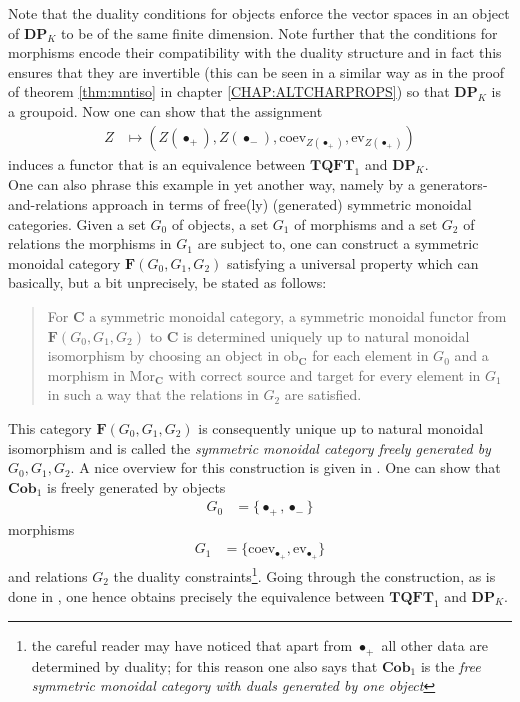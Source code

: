 Note that the duality conditions for objects enforce the vector spaces in an object of $\mathbf{DP}_{K}$ to be of the same finite dimension. Note further that the conditions for morphisms encode their compatibility with the duality structure and in fact this ensures that they are invertible (this can be seen in a similar way as in the proof of theorem \ref{thm:mntiso} in chapter \ref{CHAP:ALTCHARPROPS}) so that $\mathbf{DP}_{K}$ is a groupoid. Now one can show that the assignment
\begin{align*}
  Z
  &\mapsto
  \left(
    Z(\bullet_{+})
    ,
    Z(\bullet_{-})
    ,
    \mathrm{coev}_{Z(\bullet_{+})}
    ,
    \mathrm{ev}_{Z(\bullet_{+})}
  \right)
\end{align*}
induces a functor that is an equivalence between $\mathbf{TQFT}_{1}$ and $\mathbf{DP}_{K}$.
\\
One can also phrase this example in yet another way, namely by a generators-and-relations approach in terms of free(ly) (generated) symmetric monoidal categories. Given a set $G_{0}$ of objects, a set $G_{1}$ of morphisms and a set $G_{2}$ of relations the morphisms in $G_{1}$ are subject to, one can construct a symmetric monoidal category $\mathbf{F}(G_{0},G_{1},G_{2})$ satisfying a universal property which can basically, but a bit unprecisely, be stated as follows:
\begin{quotation}
For $\mathbf{C}$ a symmetric monoidal category, a symmetric monoidal functor from $\mathbf{F}(G_{0},G_{1},G_{2})$ to $\mathbf{C}$ is determined uniquely up to natural monoidal isomorphism by choosing an object in $\mathrm{ob}_{\mathbf{C}}$ for each element in $G_{0}$ and a morphism in $\mathrm{Mor}_{\mathbf{C}}$ with correct source and target for every element in $G_{1}$ in such a way that the relations in $G_{2}$ are satisfied.
\end{quotation}
This category $\mathbf{F}(G_{0},G_{1},G_{2})$ is consequently unique up to natural monoidal isomorphism and is called the \textit{symmetric monoidal category freely generated by $G_{0},G_{1},G_{2}$}. A nice overview for this construction is given in \cite{0a816f4c}. One can show that $\mathbf{Cob}_{1}$ is freely generated by objects
\begin{align*}
  G_{0}
  &=
  \lbrace
    \bullet_{+}
    ,
    \bullet_{-}
  \rbrace
\end{align*}
morphisms
\begin{align*}
  G_{1}
  &=
  \lbrace
    \mathrm{coev}_{\bullet_{+}}
    ,
    \mathrm{ev}_{\bullet_{+}}
  \rbrace
\end{align*}
and relations $G_{2}$ the duality constraints\footnote{the careful reader may have noticed that apart from $\bullet_{+}$ all other data are determined by duality; for this reason one also says that $\mathbf{Cob}_{1}$ is the \textit{free symmetric monoidal category with duals generated by one object}}. Going through the construction, as is done in \cite{0a816f4c}, one hence obtains precisely the equivalence between $\mathbf{TQFT}_{1}$ and $\mathbf{DP}_{K}$.

